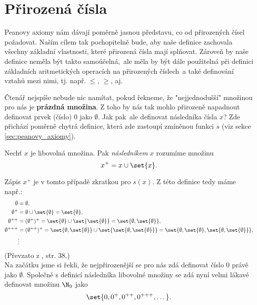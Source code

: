 \section{Přirozená čísla}\label{sec:prirozena_cisla}
Peanovy axiomy nám dávají poměrně jasnou představu, co od přirozených čísel požadovat. Naším cílem tak pochopitelně bude, aby naše definice zachovala všechny základní vlastnosti, které přirozená čísla mají splňovat. Zároveň by naše definice neměla být takto samoúčelná,~ale měla by být dále použitelná při definici základních aritmetických operacích na přirozených číslech~a také definování vztahů mezi nimi, tj. např. $\leq$, $\geq$, aj.\par
Čtenář nejspíše nebude nic namítat, pokud řekneme, že "nejjednodušší" množinou pro nás je \textbf{prázdná množina}. Z toho by nás tak mohlo přirozeně napadnout definovat prvek (číslo) 0 jako $\emptyset$. Jak pak~ale definovat následníka čísla $x$? Zde přichází poměrně chytrá definice, která zde zastoupí zmíněnou funkci $s$ (viz sekce \ref{sec:peanovy_axiomy}).
\begin{definition}[Následník]\label{def:naslednik}
    Nechť $x$ je libovolná množina. Pak \emph{následníkem} $x$ rozumíme množinu
    \begin{equation*}
        x^+=x\cup\set{x}.
    \end{equation*}
\end{definition}
Zápis $x^+$ je v tomto případě zkratkou pro $s(x)$. Z této definice tedy máme např.:
\begin{align*}
    \emptyset&=\emptyset,\\
    \emptyset^+&=\emptyset\cup\set{\emptyset}=\set{\emptyset},\\
    \emptyset^{++}&=(\emptyset^+)^+=\set{\emptyset}\cup\set{\set{\emptyset}}=\set{\emptyset,\set{\emptyset}},\\
    \emptyset^{+++}&=(\emptyset^{++})^+=\set{\emptyset,\set{\emptyset}}\cup\set{\set{\emptyset,\set{\emptyset}}}=\set{\emptyset,\set{\emptyset},\set{\emptyset,\set{\emptyset}}},\\
    &\vdots
\end{align*}
(Převzato z \cite{Goldrei2017}, str. 38.)\\
Na začátku jsme si řekli, že nejpřirozenější se pro nás zdá definovat číslo 0 právě jako $\emptyset$. Společně s definicí následníka libovolné množiny se zdá nyní velmi lákavé definovat množinu $\N_0$ jako
\begin{equation*}
    \set{0,0^+,0^{++},0^{+++},\dots}.
\end{equation*}
